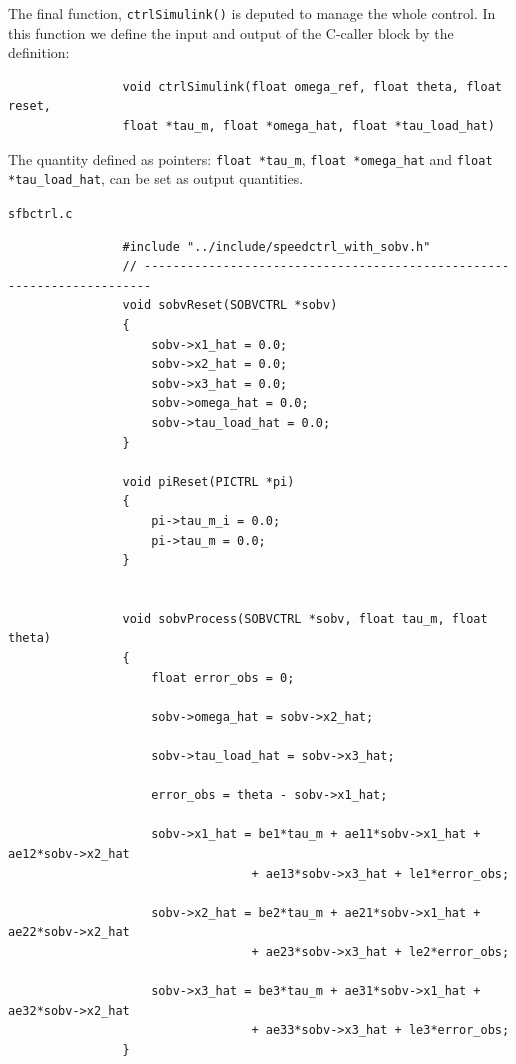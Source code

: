 \documentclass[12pt,a4paper,oneside]{book}
\begin{document}
\begin{onehalfspace}
	The final function, \texttt{ctrlSimulink()} is deputed to manage the whole control. In this function we define the input and output of the C-caller block by the definition: 
	\begin{mybox}
		{\selectfont \footnotesize \noindent
			\begin{verbatim}
				void ctrlSimulink(float omega_ref, float theta, float reset, 
				float *tau_m, float *omega_hat, float *tau_load_hat)
		\end{verbatim}}
	\end{mybox}
	The quantity defined as pointers: \texttt{float *tau\_m}, \texttt{float *omega\_hat} and \texttt{float *tau\_load\_hat}, can be set as output quantities.
	\begin{mybox}
		\begin{center}
			{\selectfont \verb+sfbctrl.c+}
		\end{center}
		{\selectfont \footnotesize \noindent
			\begin{verbatim}
				#include "../include/speedctrl_with_sobv.h"
				// -----------------------------------------------------------------------
				void sobvReset(SOBVCTRL *sobv)
				{
					sobv->x1_hat = 0.0;
					sobv->x2_hat = 0.0;
					sobv->x3_hat = 0.0;
					sobv->omega_hat = 0.0;
					sobv->tau_load_hat = 0.0;
				}
				
				void piReset(PICTRL *pi)
				{
					pi->tau_m_i = 0.0;
					pi->tau_m = 0.0;
				}
				
				
				void sobvProcess(SOBVCTRL *sobv, float tau_m, float theta)
				{
					float error_obs = 0;
					
					sobv->omega_hat = sobv->x2_hat;
					
					sobv->tau_load_hat = sobv->x3_hat;
					
					error_obs = theta - sobv->x1_hat;
					
					sobv->x1_hat = be1*tau_m + ae11*sobv->x1_hat + ae12*sobv->x2_hat 
					              + ae13*sobv->x3_hat + le1*error_obs;
					
					sobv->x2_hat = be2*tau_m + ae21*sobv->x1_hat + ae22*sobv->x2_hat
					              + ae23*sobv->x3_hat + le2*error_obs;
					
					sobv->x3_hat = be3*tau_m + ae31*sobv->x1_hat + ae32*sobv->x2_hat 
					              + ae33*sobv->x3_hat + le3*error_obs;
				}
				

\end{verbatim}}
\end{mybox}
\end{onehalfspace}
\end{document}
